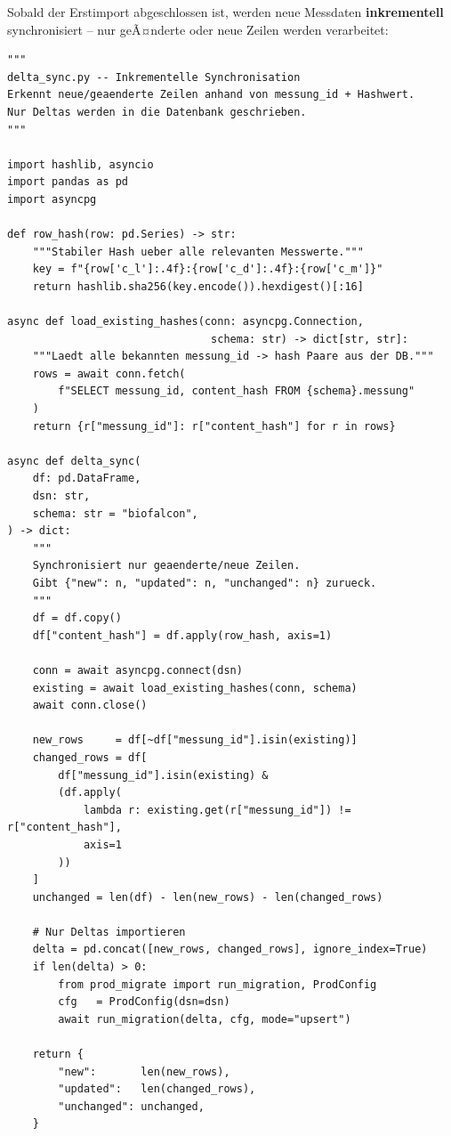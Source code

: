 ﻿\documentclass[12pt,a4paper]{report}
\theoremstyle{definition}
\theoremstyle{remark}
\begin{document}
Sobald der Erstimport abgeschlossen ist, werden neue Messdaten
\textbf{inkrementell} synchronisiert -- nur geÃ¤nderte oder neue
Zeilen werden verarbeitet:

\begin{lstlisting}[style=python, caption={delta\_sync.py: Inkrementelle Synchronisation neuer Messdaten}]
"""
delta_sync.py -- Inkrementelle Synchronisation
Erkennt neue/geaenderte Zeilen anhand von messung_id + Hashwert.
Nur Deltas werden in die Datenbank geschrieben.
"""

import hashlib, asyncio
import pandas as pd
import asyncpg

def row_hash(row: pd.Series) -> str:
    """Stabiler Hash ueber alle relevanten Messwerte."""
    key = f"{row['c_l']:.4f}:{row['c_d']:.4f}:{row['c_m']}"
    return hashlib.sha256(key.encode()).hexdigest()[:16]

async def load_existing_hashes(conn: asyncpg.Connection,
                                schema: str) -> dict[str, str]:
    """Laedt alle bekannten messung_id -> hash Paare aus der DB."""
    rows = await conn.fetch(
        f"SELECT messung_id, content_hash FROM {schema}.messung"
    )
    return {r["messung_id"]: r["content_hash"] for r in rows}

async def delta_sync(
    df: pd.DataFrame,
    dsn: str,
    schema: str = "biofalcon",
) -> dict:
    """
    Synchronisiert nur geaenderte/neue Zeilen.
    Gibt {"new": n, "updated": n, "unchanged": n} zurueck.
    """
    df = df.copy()
    df["content_hash"] = df.apply(row_hash, axis=1)

    conn = await asyncpg.connect(dsn)
    existing = await load_existing_hashes(conn, schema)
    await conn.close()

    new_rows     = df[~df["messung_id"].isin(existing)]
    changed_rows = df[
        df["messung_id"].isin(existing) &
        (df.apply(
            lambda r: existing.get(r["messung_id"]) != r["content_hash"],
            axis=1
        ))
    ]
    unchanged = len(df) - len(new_rows) - len(changed_rows)

    # Nur Deltas importieren
    delta = pd.concat([new_rows, changed_rows], ignore_index=True)
    if len(delta) > 0:
        from prod_migrate import run_migration, ProdConfig
        cfg   = ProdConfig(dsn=dsn)
        await run_migration(delta, cfg, mode="upsert")

    return {
        "new":       len(new_rows),
        "updated":   len(changed_rows),
        "unchanged": unchanged,
    }
\end{lstlisting}
\end{document}
